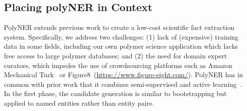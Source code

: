 \subsection{Placing polyNER in Context}
PolyNER extends previous work to create a low-cost scientific fact extraction system. 
Specifically, we address two challenges: 
(1) lack of (expensive) training data in some fields, including our own polymer science application which lacks free access to large polymer databases; and 
(2) the need for domain expert curators, which impedes the use of crowdsourcing platforms such as Amazon Mechanical Turk~\cite{buhrmester2011amazon} or Figure8~(\url{https://www.figure-eight.com/}).
PolyNER has in common with prior work that it combines semi-supervised and active learning~\cite{nguyen2004active,basu2004active}.
In the first phase, the candidate generation is similar to bootstrapping but applied to named entities rather than entity pairs. 
